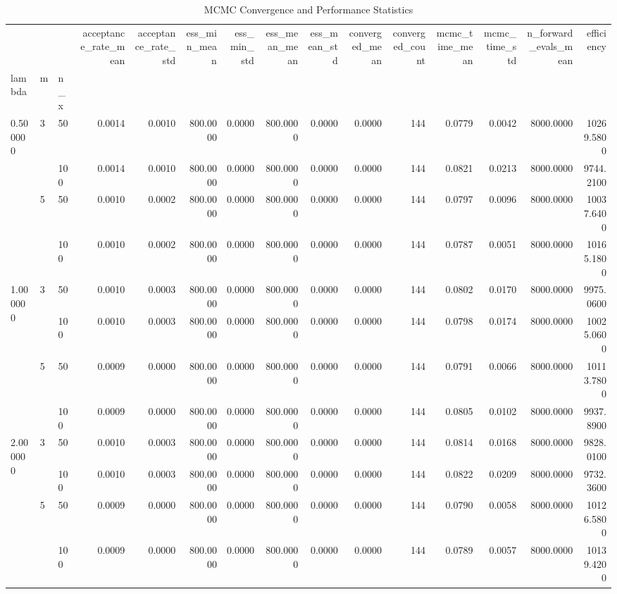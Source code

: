 \begin{table}
\caption{MCMC Convergence and Performance Statistics}
\label{tab:convergence}
\begin{tabular}{lllrrrrrrrrrrrr}
\toprule
 &  &  & acceptance_rate_mean & acceptance_rate_std & ess_min_mean & ess_min_std & ess_mean_mean & ess_mean_std & converged_mean & converged_count & mcmc_time_mean & mcmc_time_std & n_forward_evals_mean & efficiency \\
lambda & m & n_x &  &  &  &  &  &  &  &  &  &  &  &  \\
\midrule
\multirow[t]{4}{*}{0.500000} & \multirow[t]{2}{*}{3} & 50 & 0.0014 & 0.0010 & 800.0000 & 0.0000 & 800.0000 & 0.0000 & 0.0000 & 144 & 0.0779 & 0.0042 & 8000.0000 & 10269.5800 \\
 &  & 100 & 0.0014 & 0.0010 & 800.0000 & 0.0000 & 800.0000 & 0.0000 & 0.0000 & 144 & 0.0821 & 0.0213 & 8000.0000 & 9744.2100 \\
\cline{2-15}
 & \multirow[t]{2}{*}{5} & 50 & 0.0010 & 0.0002 & 800.0000 & 0.0000 & 800.0000 & 0.0000 & 0.0000 & 144 & 0.0797 & 0.0096 & 8000.0000 & 10037.6400 \\
 &  & 100 & 0.0010 & 0.0002 & 800.0000 & 0.0000 & 800.0000 & 0.0000 & 0.0000 & 144 & 0.0787 & 0.0051 & 8000.0000 & 10165.1800 \\
\cline{1-15} \cline{2-15}
\multirow[t]{4}{*}{1.000000} & \multirow[t]{2}{*}{3} & 50 & 0.0010 & 0.0003 & 800.0000 & 0.0000 & 800.0000 & 0.0000 & 0.0000 & 144 & 0.0802 & 0.0170 & 8000.0000 & 9975.0600 \\
 &  & 100 & 0.0010 & 0.0003 & 800.0000 & 0.0000 & 800.0000 & 0.0000 & 0.0000 & 144 & 0.0798 & 0.0174 & 8000.0000 & 10025.0600 \\
\cline{2-15}
 & \multirow[t]{2}{*}{5} & 50 & 0.0009 & 0.0000 & 800.0000 & 0.0000 & 800.0000 & 0.0000 & 0.0000 & 144 & 0.0791 & 0.0066 & 8000.0000 & 10113.7800 \\
 &  & 100 & 0.0009 & 0.0000 & 800.0000 & 0.0000 & 800.0000 & 0.0000 & 0.0000 & 144 & 0.0805 & 0.0102 & 8000.0000 & 9937.8900 \\
\cline{1-15} \cline{2-15}
\multirow[t]{4}{*}{2.000000} & \multirow[t]{2}{*}{3} & 50 & 0.0010 & 0.0003 & 800.0000 & 0.0000 & 800.0000 & 0.0000 & 0.0000 & 144 & 0.0814 & 0.0168 & 8000.0000 & 9828.0100 \\
 &  & 100 & 0.0010 & 0.0003 & 800.0000 & 0.0000 & 800.0000 & 0.0000 & 0.0000 & 144 & 0.0822 & 0.0209 & 8000.0000 & 9732.3600 \\
\cline{2-15}
 & \multirow[t]{2}{*}{5} & 50 & 0.0009 & 0.0000 & 800.0000 & 0.0000 & 800.0000 & 0.0000 & 0.0000 & 144 & 0.0790 & 0.0058 & 8000.0000 & 10126.5800 \\
 &  & 100 & 0.0009 & 0.0000 & 800.0000 & 0.0000 & 800.0000 & 0.0000 & 0.0000 & 144 & 0.0789 & 0.0057 & 8000.0000 & 10139.4200 \\
\cline{1-15} \cline{2-15}
\bottomrule
\end{tabular}
\end{table}

